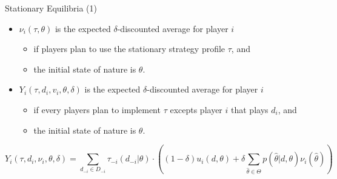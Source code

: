 \begin{frame}{Stationary Equilibria (1)}
    \begin{itemize}
        \item $\nu_i(\tau, \theta)$ is the expected $\delta$-discounted average for player $i$
        \begin{itemize}
            \item if players plan to use the stationary strategy profile $\tau$, and 
            \item the initial state of nature is $\theta$.
        \end{itemize}
        \item $Y_i(\tau, d_i, v_i, \theta, \delta)$ is the expected $\delta$-discounted average for
        player $i$
        \begin{itemize}
            \item if every players plan to implement $\tau$ excepts player $i$ that plays $d_i$, and
            \item the initial state of nature is $\theta$.
        \end{itemize}
    \end{itemize}

    \begin{small}
        \begin{equation}
            Y_i(\tau, d_i, \nu_i, \theta, \delta) =
            \sum_{d_{-i} \in D_{-i}} \tau_{-i}(d_{-i}|\theta)
            \cdot  \left(  (1-\delta) u_i(d,\theta) + \delta \sum_{\hat{\theta} \in \Theta}
           	p(\hat{\theta} |d,\theta) \nu_i (\hat{\theta}) \right)
        \end{equation}  
    \end{small}
\end{frame}

